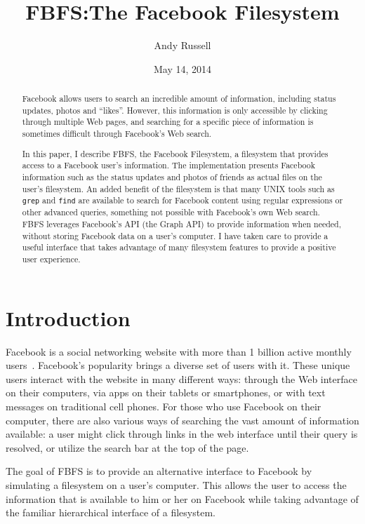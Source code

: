 \documentclass[11pt,twocolumn]{article}
\begin{document}
\title{FBFS:\@ The Facebook Filesystem}
\author{Andy Russell}
\date{May 14, 2014}
\maketitle

\begin{abstract}

Facebook allows users to search an incredible amount of information, including
status updates, photos and ``likes''. However, this information is only
accessible by clicking through multiple Web pages, and searching for a specific
piece of information is sometimes difficult through Facebook's Web search.

In this paper, I describe FBFS, the Facebook Filesystem, a filesystem that
provides access to a Facebook user's information. The implementation presents
Facebook information such as the status updates and photos of friends as actual
files on the user's filesystem. An added benefit of the filesystem is that many
UNIX tools such as \texttt{grep} and \texttt{find} are available to search for
Facebook content using regular expressions or other advanced queries, something
not possible with Facebook's own Web search. FBFS leverages Facebook's API (the
Graph API) to provide information when needed, without storing Facebook data on
a user's computer. I have taken care to provide a useful interface that takes
advantage of many filesystem features to provide a positive user experience.

\end{abstract}

\section{Introduction}

Facebook is a social networking website with more than 1 billion active monthly
users~\cite{aboutfb}. Facebook's popularity brings a diverse set of users with
it. These unique users interact with the website in many different ways:
through the Web interface on their computers, via apps on their tablets or
smartphones, or with text messages on traditional cell phones. For those who
use Facebook on their computer, there are also various ways of searching the
vast amount of information available: a user might click through links in the
web interface until their query is resolved, or utilize the search bar at the
top of the page.

The goal of FBFS is to provide an alternative interface to Facebook by
simulating a filesystem on a user's computer. This allows the user to access
the information that is available to him or her on Facebook while taking
advantage of the familiar hierarchical interface of a filesystem.
\end{document}
